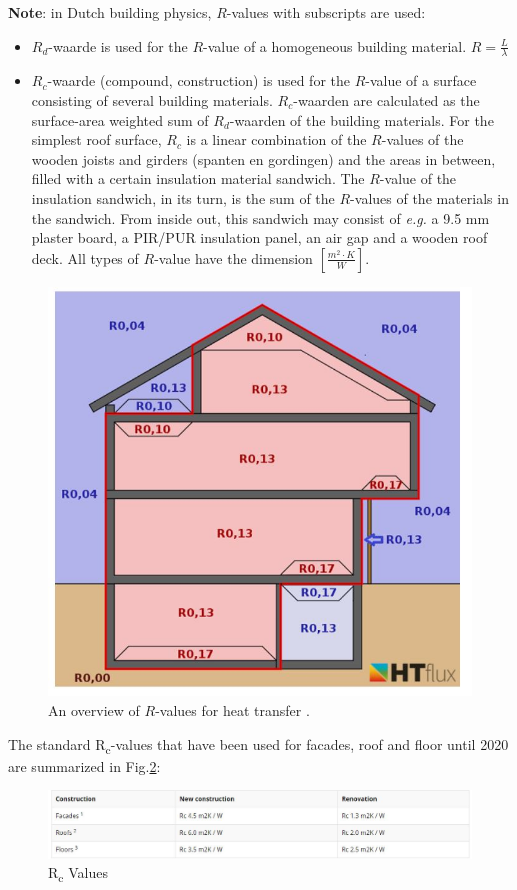 \textbf{Note}: in Dutch building physics, $R$-values with subscripts are used:
\begin{itemize}
	\item $R_d$-waarde is used for the $R$-value of a homogeneous building material. $ R = \frac{L}{\lambda} $
	\item $R_c$-waarde (compound, construction) is used for the $R$-value of a surface consisting of several building materials. $R_c$-waarden are calculated as the surface-area weighted sum of $R_d$-waarden of the building materials. 
	For the simplest roof surface, $R_c$ is a linear combination of the $R$-values of the wooden joists and girders (spanten en gordingen) and the areas in between, filled with a certain insulation material sandwich.
	The $R$-value of the insulation sandwich, in its turn, is the sum of the $R$-values of the materials in the sandwich. From inside out, this sandwich may consist of \textit{e.g.} a 9.5 mm plaster board, a PIR/PUR insulation panel, an air gap and a wooden roof deck. All types of $R$-value have the dimension $ [\frac{m^2 \cdot K}{W}] $.
\end{itemize}

\begin{figure}[H]
	\centering
	\includegraphics[width=0.6\columnwidth]{Pictures/Overview of heat resistances.JPG}
	\caption[Short title]{An overview of $R$-values for heat transfer \cite{SURFREST}.}
	\label{fig:overview}
\end{figure}


The standard R\textsubscript{c}-values that have been used for facades, roof and floor until 2020 are summarized in Fig.\ref{fig:Rcvalues}:

\begin{figure}[H]
	\centering
	\includegraphics[width=1.0\columnwidth]{Pictures/Rc_values_2020.JPG}
	\caption[Short title]{R\textsubscript{c} Values \cite{ISOL}}
	\label{fig:Rcvalues}
\end{figure}

